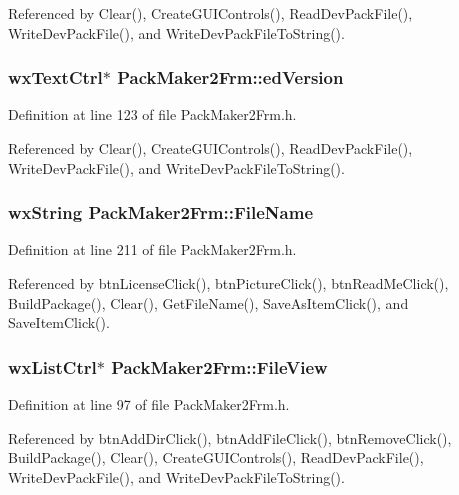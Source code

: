 Referenced by Clear(), Create\-GUIControls(), Read\-Dev\-Pack\-File(), Write\-Dev\-Pack\-File(), and Write\-Dev\-Pack\-File\-To\-String().
\subsubsection{\setlength{\rightskip}{0pt plus 5cm}wx\-Text\-Ctrl$\ast$ {\bf Pack\-Maker2Frm::ed\-Version}\hspace{0.3cm}{\tt  [private]}}\label{class_pack_maker2_frm_35b57e6f73d3214633a42cbe06584956}




Definition at line 123 of file Pack\-Maker2Frm.h.

Referenced by Clear(), Create\-GUIControls(), Read\-Dev\-Pack\-File(), Write\-Dev\-Pack\-File(), and Write\-Dev\-Pack\-File\-To\-String().
\subsubsection{\setlength{\rightskip}{0pt plus 5cm}wx\-String {\bf Pack\-Maker2Frm::File\-Name}\hspace{0.3cm}{\tt  [private]}}\label{class_pack_maker2_frm_dcc98ef36ca26fc22e62968e2a345bc2}




Definition at line 211 of file Pack\-Maker2Frm.h.

Referenced by btn\-License\-Click(), btn\-Picture\-Click(), btn\-Read\-Me\-Click(), Build\-Package(), Clear(), Get\-File\-Name(), Save\-As\-Item\-Click(), and Save\-Item\-Click().
\subsubsection{\setlength{\rightskip}{0pt plus 5cm}wx\-List\-Ctrl$\ast$ {\bf Pack\-Maker2Frm::File\-View}\hspace{0.3cm}{\tt  [private]}}\label{class_pack_maker2_frm_d92cee45844fa0d5e168d25a5f69aaef}




Definition at line 97 of file Pack\-Maker2Frm.h.

Referenced by btn\-Add\-Dir\-Click(), btn\-Add\-File\-Click(), btn\-Remove\-Click(), Build\-Package(), Clear(), Create\-GUIControls(), Read\-Dev\-Pack\-File(), Write\-Dev\-Pack\-File(), and Write\-Dev\-Pack\-File\-To\-String().
